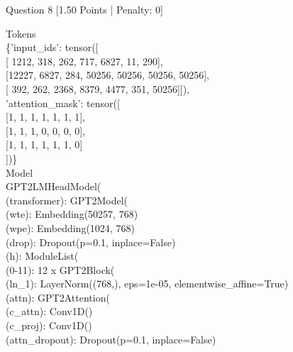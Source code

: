 \documentclass[11pt,a4paper]{article}
\begin{document}
\begin{questionbox}{Question 8 \hfill [1.50 Points | Penalty: 0]}
\begin{tcolorbox}[colback=white, colframe=lightgray!80, arc=1mm, boxrule=0.5pt]
\footnotesize\ttfamily
Tokens\\
\{'input\_ids': tensor([\\
\hspace*{1.5em}[ 1212,   318,   262,   717,  6827,    11,   290],\\
\hspace*{1.5em}[12227,  6827,   284, 50256, 50256, 50256, 50256],\\
\hspace*{1.5em}[  392,   262,  2368,  8379,  4477,   351, 50256]]),\\
'attention\_mask': tensor([\\
\hspace*{1.5em}[1, 1, 1, 1, 1, 1, 1],\\
\hspace*{1.5em}[1, 1, 1, 0, 0, 0, 0],\\
\hspace*{1.5em}[1, 1, 1, 1, 1, 1, 0]\\
])\}\\
Model\\
GPT2LMHeadModel(\\
\hspace*{1.5em}(transformer): GPT2Model(\\
\hspace*{3.0em}(wte): Embedding(50257, 768)\\
\hspace*{3.0em}(wpe): Embedding(1024, 768)\\
\hspace*{3.0em}(drop): Dropout(p=0.1, inplace=False)\\
\hspace*{3.0em}(h): ModuleList(\\
\hspace*{4.5em}(0-11): 12 x GPT2Block(\\
\hspace*{6.0em}(ln\_1): LayerNorm((768,), eps=1e-05, elementwise\_affine=True)\\
\hspace*{6.0em}(attn): GPT2Attention(\\
\hspace*{7.5em}(c\_attn): Conv1D()\\
\hspace*{7.5em}(c\_proj): Conv1D()\\
\hspace*{7.5em}(attn\_dropout): Dropout(p=0.1, inplace=False)\\

\end{tcolorbox}
\end{questionbox}
\end{document}
